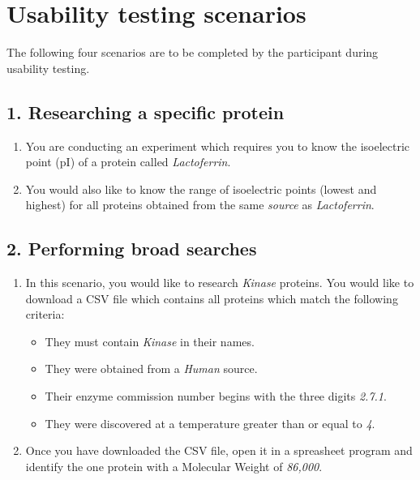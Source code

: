 \chapter{Usability testing scenarios}\label{app:evaluation-scenarios}

The following four scenarios are to be completed by the participant
during usability testing.

\section*{1. Researching a specific protein}
\begin{enumerate}
\item You are conducting an experiment which requires you to know the
  isoelectric point (pI) of a protein called \textit{Lactoferrin}.
\item You would also like to know the range of isoelectric points
  (lowest and highest) for all proteins obtained from the same
  \textit{source} as \textit{Lactoferrin}.
\end{enumerate}

\section*{2. Performing broad searches}
\begin{enumerate}
\item In this scenario, you would like to research \textit{Kinase}
  proteins. You would like to download a CSV file which contains all
  proteins which match the following criteria:
  \begin{itemize}
  \item They must contain \textit{Kinase} in their names.
  \item They were obtained from a \textit{Human} source.
  \item Their enzyme commission number begins with the three digits
    \textit{2.7.1}.
  \item They were discovered at a temperature greater than or equal to \textit{4\celsius}.
  \end{itemize}
\item Once you have downloaded the CSV file, open it in a spreasheet
  program and identify the one protein with a Molecular Weight of
  \textit{86,000}.
\end{enumerate}

